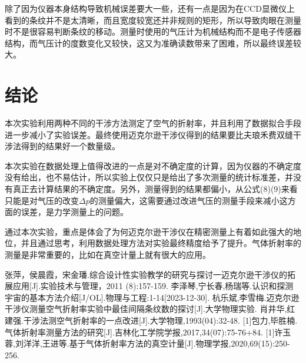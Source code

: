 \documentclass{WHUReport}
\begin{document}
\begin{multicols}{2}
	除了因为仪器本身结构导致机械误差要大一些，还有一点是因为在CCD显微仪上看到的条纹并不是太清晰，而且宽度较宽还并非规则的矩形，所以导致肉眼在测量时不是很容易判断条纹的移动。测量时使用的气压计为机械结构而不是电子传感器结构，而气压计的度数变化又较快，这又为准确读数带来了困难，所以最终误差较大。
	
	\section{结\quad 论}
	本次实验利用两种不同的干涉方法测定了空气的折射率，并且利用了数据拟合手段进一步减小了实验误差。最终使用迈克尔逊干涉仪得到的结果要比夫琅禾费双缝干涉法得到的结果好一个数量级。
	
	本次实验在数据处理上值得改进的一点是对不确定度的计算，因为仪器的不确定度没有给出，也不易估计，所以实验上仅仅只是给出了多次测量的统计标准差，并没有真正去计算结果的不确定度。另外，测量得到的结果都偏小，从公式(8)(9)来看只能是对气压的改变$\Delta p$的测量偏大，这需要通过改进气压的测量手段来减小这方面的误差，是力学测量上的问题。
	
	通过本次实验，重点是体会了为何迈克尔逊干涉仪在精密测量上有着如此强大的地位，并且通过思考，利用数据处理方法对实验最终精度给予了提升。气体折射率的测量是非常重要的，比如在真空计量上就有很大的应用。
	
	

	\begin{thebibliography}{99}  
		 张萍，侯晨霞，宋金璠.综合设计性实验教学的研究与探讨一迈克尔逊干涉仪的拓展应用[J].实验技术与管理，2011 (8):157-159.
		李泽琴,宁长春,杨瑞等.认识和探测宇宙的基本方法介绍[J/OL].物理与工程:1-14[2023-12-30].
		杭乐斌,李雪梅.迈克尔逊干涉仪测量空气折射率实验中最佳间隔条纹数的探讨[J].大学物理实验.
		肖井华,红建强.干涉法测空气折射率的一点改进[J].大学物理,1993(04):32-48.
		[1]包力,毕胜楠.气体折射率测量方法的研究[J].吉林化工学院学报,2017,34(07):75-76+84.
		[1]许玉蓉,刘洋洋,王进等.基于气体折射率方法的真空计量[J].物理学报,2020,69(15):250-256.
	\end{thebibliography}
\end{multicols}
\end{document}
